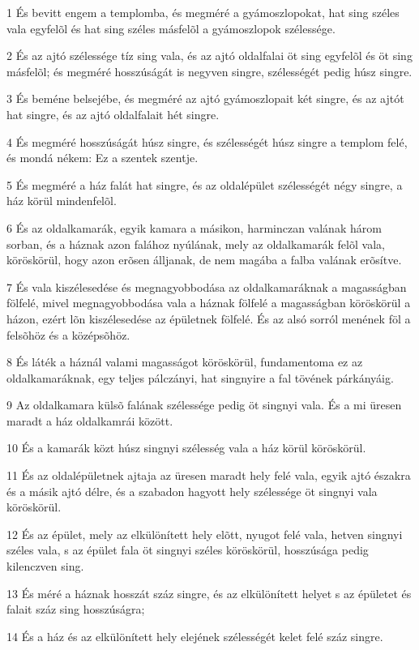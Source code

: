 \par 1 És bevitt engem a templomba, és megméré a gyámoszlopokat, hat sing széles vala egyfelõl és hat sing széles másfelõl a gyámoszlopok szélessége.
\par 2 És az ajtó szélessége tíz sing vala, és az ajtó oldalfalai öt sing egyfelõl és öt sing másfelõl; és megméré hosszúságát is negyven singre, szélességét pedig húsz singre.
\par 3 És beméne belsejébe, és megméré az ajtó gyámoszlopait két singre, és az ajtót hat singre, és az ajtó oldalfalait hét singre.
\par 4 És megméré hosszúságát húsz singre, és szélességét húsz singre a templom felé, és mondá nékem: Ez a szentek  szentje.
\par 5 És megméré a ház falát hat singre, és az oldalépület szélességét négy singre, a ház körül mindenfelõl.
\par 6 És az oldalkamarák, egyik kamara a másikon, harminczan valának három sorban, és a háznak azon falához nyúlának, mely az oldalkamarák felõl vala, köröskörül, hogy azon erõsen álljanak, de nem magába a falba valának erõsítve.
\par 7 És vala kiszélesedése és megnagyobbodása az oldalkamaráknak a magasságban fölfelé, mivel megnagyobbodása vala a háznak fölfelé a magasságban köröskörül a házon, ezért lõn kiszélesedése az épületnek fölfelé. És az alsó sorról menének föl a felsõhöz és a középsõhöz.
\par 8 És láték a háznál valami magasságot köröskörül, fundamentoma ez az oldalkamaráknak, egy teljes pálczányi, hat singnyire a fal tövének párkányáig.
\par 9 Az oldalkamara külsõ falának szélessége pedig öt singnyi vala. És a mi üresen maradt a ház oldalkamrái között.
\par 10 És a kamarák közt húsz singnyi szélesség vala a ház körül köröskörül.
\par 11 És az oldalépületnek ajtaja az üresen maradt hely felé vala, egyik ajtó északra és a másik ajtó délre, és a szabadon hagyott hely szélessége öt singnyi vala köröskörül.
\par 12 És az épület, mely az elkülönített hely elõtt, nyugot felé vala, hetven singnyi széles vala, s az épület fala öt singnyi széles köröskörül, hosszúsága pedig kilenczven sing.
\par 13 És méré a háznak hosszát száz singre, és az elkülönített helyet s az épületet és falait száz sing hosszúságra;
\par 14 És a ház és az elkülönített hely elejének szélességét kelet felé száz singre.
